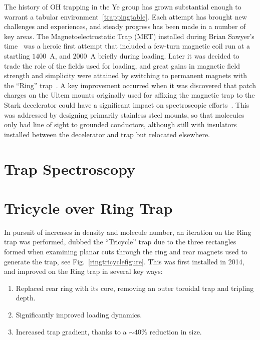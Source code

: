 \documentclass[defaultstyle,11pt]{thesis}
\begin{document}
The history of OH trapping in the Ye group has grown substantial enough to warrant a tabular environment~\ref{trappingtable}. 
Each attempt has brought new challenges and experiences, and steady progress has been made in a number of key areas.
The Magnetoelectrostatic Trap (MET) installed during Brian Sawyer's time~\cite{Sawyer2007} was a heroic first attempt that included a few-turn magnetic coil run at a startling $1400$~A, and $2000$~A briefly during loading.
Later it was decided to trade the role of the fields used for loading, and great gains in magnetic field strength and simplicity were attained by switching to permanent magnets with the ``Ring'' trap~\cite{Sawyer2011}.
A key improvement occurred when it was discovered that patch charges on the Ultem mounts originally used for affixing the magnetic trap to the Stark decelerator could have a significant impact on spectroscopic efforts~\citep[Fig.~6]{Stuhl2012uwave}.
This was addressed by designing primarily stainless steel mounts, so that molecules only had line of sight to grounded conductors, although still with insulators installed between the decelerator and trap but relocated elsewhere.

\section{Trap Spectroscopy}

\section{Tricycle over Ring Trap}

In pursuit of increases in density and molecule number, an iteration on the Ring trap was performed, dubbed the ``Tricycle'' trap due to the three rectangles formed when examining planar cuts through the ring and rear magnets used to generate the trap, see Fig.~\ref{ringtricyclefigure}.
This was first installed in 2014, and improved on the Ring trap in several key ways:
\begin{enumerate}
\item Replaced rear ring with its core, removing an outer toroidal trap and tripling depth.
\item Significantly improved loading dynamics.
\item Increased trap gradient, thanks to a $\sim 40\%$ reduction in size.
\end{enumerate}
\end{document}
